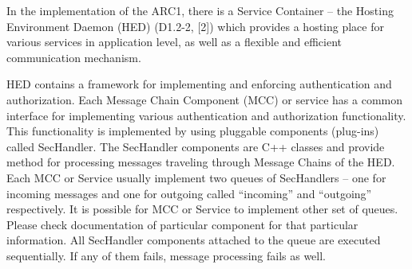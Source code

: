 \documentclass{article}                            %
\begin{document}
In the implementation of the ARC1, there is a Service Container – the Hosting Environment Daemon (HED) (D1.2-2, [2]) which provides a hosting place for various services in application level, as well as a flexible and efficient communication mechanism.

HED contains a framework for implementing and enforcing authentication and authorization. Each Message Chain Component (MCC) or service has a common interface for implementing various authentication and authorization functionality. This functionality is implemented by using pluggable components (plug-ins) called SecHandler. The SecHandler components are C++ classes and provide method for processing messages traveling through Message Chains of the HED. Each MCC or Service  usually implement two queues of SecHandlers – one for incoming messages and one for outgoing called ``incoming'' and ``outgoing'' respectively. It is possible for MCC or Service to implement other set of queues. Please check documentation of particular component for that particular information. All SecHandler components attached to the queue are executed sequentially. If any of them fails, message processing fails as well.

\begin{figure}[ht]
\end{figure}
\end{document}
